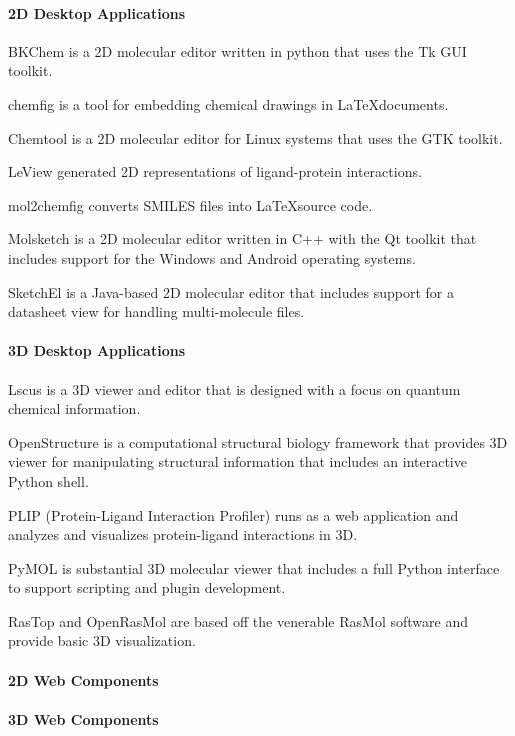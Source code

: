 \paragraph{2D Desktop Applications}

BKChem is a 2D molecular editor written in python that uses the Tk GUI toolkit.

chemfig is a tool for embedding chemical drawings in \LaTeX documents.

Chemtool is a 2D molecular editor for Linux systems that uses the GTK toolkit.

LeView \cite{Caboche_2013} generated 2D representations of ligand-protein interactions.

mol2chemfig \cite{Brefo_Mensah_2012} converts SMILES files into \LaTeX source code.

Molsketch is a 2D molecular editor written in C++ with the Qt toolkit that includes support for the Windows and Android operating systems.

SketchEl is a Java-based 2D molecular editor that includes support for a datasheet view for handling multi-molecule files.



\paragraph{3D Desktop Applications}

Lscus \cite{Kova_evi__2015} is a 3D viewer and editor that is designed with a focus on quantum chemical information.

OpenStructure \cite{Biasini_2013} is a computational structural biology framework that provides 3D viewer for manipulating structural information that includes an interactive Python shell.

PLIP (Protein-Ligand Interaction Profiler) \cite{Salentin_2015} runs as a web application and analyzes and visualizes protein-ligand interactions in 3D.

PyMOL is substantial 3D molecular viewer that includes a full Python interface to support scripting and plugin development.

RasTop and OpenRasMol are based off the venerable RasMol software and provide basic 3D visualization. 



\paragraph{2D Web Components}

\paragraph{3D Web Components}